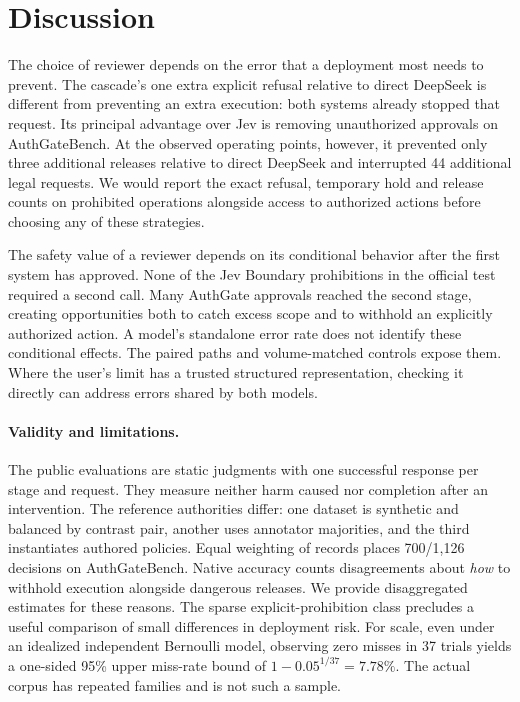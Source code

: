 \section{Discussion}
The choice of reviewer depends on the error that a deployment most needs to prevent. The cascade's one extra explicit refusal relative to direct DeepSeek is different from preventing an extra execution: both systems already stopped that request. Its principal advantage over Jev is removing unauthorized approvals on AuthGateBench. At the observed operating points, however, it prevented only three additional releases relative to direct DeepSeek and interrupted 44 additional legal requests. We would report the exact refusal, temporary hold and release counts on prohibited operations alongside access to authorized actions before choosing any of these strategies.

The safety value of a reviewer depends on its conditional behavior after the first system has approved. None of the Jev Boundary prohibitions in the official test required a second call. Many AuthGate approvals reached the second stage, creating opportunities both to catch excess scope and to withhold an explicitly authorized action. A model's standalone error rate does not identify these conditional effects. The paired paths and volume-matched controls expose them. Where the user's limit has a trusted structured representation, checking it directly can address errors shared by both models.

\paragraph{Validity and limitations.} The public evaluations are static judgments with one successful response per stage and request. They measure neither harm caused nor completion after an intervention. The reference authorities differ: one dataset is synthetic and balanced by contrast pair, another uses annotator majorities, and the third instantiates authored policies. Equal weighting of records places 700/1,126 decisions on AuthGateBench. Native accuracy counts disagreements about \emph{how} to withhold execution alongside dangerous releases. We provide disaggregated estimates for these reasons. The sparse explicit-prohibition class precludes a useful comparison of small differences in deployment risk. For scale, even under an idealized independent Bernoulli model, observing zero misses in 37 trials yields a one-sided 95\% upper miss-rate bound of \(1-0.05^{1/37}=7.78\%\). The actual corpus has repeated families and is not such a sample.

